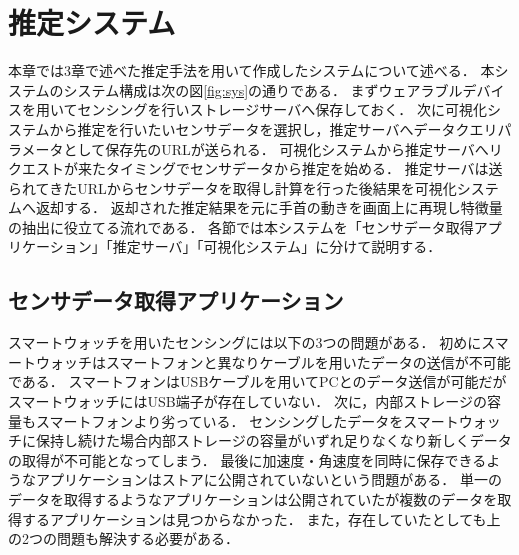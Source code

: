 \chapter{推定システム}
本章では3章で述べた推定手法を用いて作成したシステムについて述べる．
本システムのシステム構成は次の図\ref{fig:sys}の通りである．
まずウェアラブルデバイスを用いてセンシングを行いストレージサーバへ保存しておく．
次に可視化システムから推定を行いたいセンサデータを選択し，推定サーバへデータクエリパラメータとして保存先のURLが送られる．
可視化システムから推定サーバへリクエストが来たタイミングでセンサデータから推定を始める．
推定サーバは送られてきたURLからセンサデータを取得し計算を行った後結果を可視化システムへ返却する．
返却された推定結果を元に手首の動きを画面上に再現し特徴量の抽出に役立てる流れである．
各節では本システムを「センサデータ取得アプリケーション」「推定サーバ」「可視化システム」に分けて説明する．
\section{センサデータ取得アプリケーション}
スマートウォッチを用いたセンシングには以下の3つの問題がある．
初めにスマートウォッチはスマートフォンと異なりケーブルを用いたデータの送信が不可能である．
スマートフォンはUSBケーブルを用いてPCとのデータ送信が可能だがスマートウォッチにはUSB端子が存在していない．
次に，内部ストレージの容量もスマートフォンより劣っている．
センシングしたデータをスマートウォッチに保持し続けた場合内部ストレージの容量がいずれ足りなくなり新しくデータの取得が不可能となってしまう．
最後に加速度・角速度を同時に保存できるようなアプリケーションはストアに公開されていないという問題がある．
単一のデータを取得するようなアプリケーションは公開されていたが複数のデータを取得するアプリケーションは見つからなかった．
また，存在していたとしても上の2つの問題も解決する必要がある．

